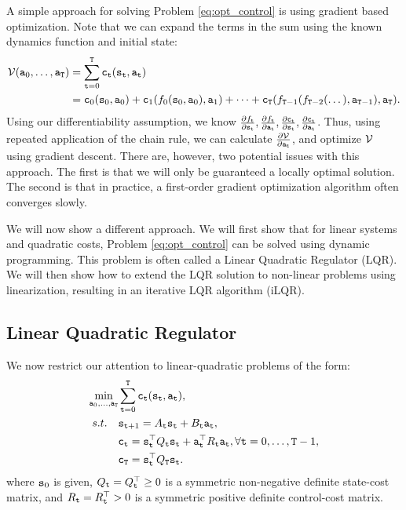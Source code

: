 A simple approach for solving Problem \ref{eq:opt_control} is using gradient based optimization. Note that we can expand the terms in the sum using the known dynamics function and initial state:
\begin{equation*}
\begin{split}
        \mathcal{V}({\tt a}_0,\dots,{\tt a}_{\tt T}) &= \sum_{{\tt t}=0}^{\tt T} {\tt c}_{\tt t}({\tt s}_{\tt t}, {\tt a}_{\tt t}) \\
        & = {\tt c}_0({\tt s}_0, {\tt a}_0) + {\tt c}_1(f_0({\tt s}_0,{\tt a}_0), {\tt a}_1) + \dots + {\tt c}_{\tt T}(f_{{\tt T} - 1}(f_{{\tt T} - 2}(\dots ),{\tt a}_{{\tt T}-1}), {\tt a}_{\tt T}).
\end{split}
\end{equation*}
Using our differentiability assumption, we know $\frac{\partial f_{\tt t}}{\partial {\tt s}_{\tt t}}, \frac{\partial f_{\tt t}}{\partial {\tt a}_{\tt t}}, \frac{\partial {\tt c}_{\tt t}}{\partial {\tt s}_{\tt t}}, \frac{\partial {\tt c}_{\tt t}}{\partial {\tt a}_{\tt t}}$. Thus, using repeated application of the chain rule, we can calculate $\frac{\partial \mathcal{V}}{\partial {\tt a}_{\tt t}}$, and optimize $\mathcal{V}$ using gradient descent. There are, however, two potential issues with this approach. The first is that we will only be guaranteed a locally optimal solution. The second is that in practice, a first-order gradient optimization algorithm often converges slowly.

We will now show a different approach. We will first show that for linear systems and quadratic costs, Problem \ref{eq:opt_control} can be solved using dynamic programming. This problem is often called a Linear Quadratic Regulator (LQR). We will then show how to extend the LQR solution to non-linear problems using linearization, resulting in an iterative LQR algorithm (iLQR).

\subsection{Linear Quadratic Regulator}

We now restrict our attention to linear-quadratic problems of the form:
\begin{equation}\label{eq:lqr}
    \begin{split}
        \min_{{\tt a}_0,\dots,{\tt a}_{{\tt T}}} & \sum_{{\tt t}=0}^{\tt T} {\tt c}_{\tt t}({\tt s}_{\tt t}, {\tt a}_{\tt t}), \\
        s.t. \quad & {{\tt s}_{{\tt t}+1}} = A_{\tt t} {\tt s}_{\tt t} + B_{\tt t} {\tt a}_{\tt t}, \\
        & {\tt c}_{\tt t} = {\tt s}_{\tt t}^\top Q_{\tt t} {\tt s}_{\tt t} + {\tt a}_{\tt t}^\top R_{\tt t} {\tt a}_{\tt t}, \forall {\tt t}=0,\dots,{\tt T}-1, \\
        & {\tt c}_{\tt T} = {\tt s}_{\tt t}^\top Q_{\tt T} {\tt s}_{\tt t}.
    \end{split}
\end{equation}
where ${\tt s}_0$ is given, $Q_{\tt t}=Q_{\tt t}^\top \geq 0$ is a symmetric non-negative definite state-cost matrix, and $R_{\tt t} = R_{\tt t}^\top > 0 $ is a symmetric positive definite control-cost matrix.

